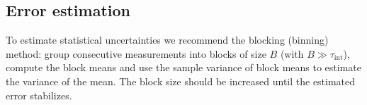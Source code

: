 \subsection{Error estimation}
To estimate statistical uncertainties we recommend the blocking (binning)
method: group consecutive measurements into blocks of size \(B\) (with
\(B\gg \tau_{\mathrm{int}}\)), compute the block means and use the sample
variance of block means to estimate the variance of the mean. The block size
should be increased until the estimated error stabilizes.
